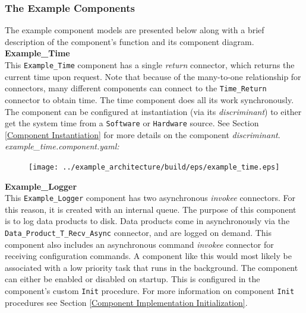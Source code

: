 \subsubsection{The Example Components} \label{The Example Components}

The example component models are presented below along with a brief description of the component's function and its component diagram. \\

\textbf{Example\_Time} \\

This \texttt{Example\_Time} component has a single \textit{return} connector, which returns the current time upon request. Note that because of the many-to-one relationship for connectors, many different components can connect to the \texttt{Time\_Return} connector to obtain time. The time component does all its work synchronously. The component can be configured at instantiation (via its \textit{discriminant}) to either get the system time from a \texttt{Software} or \texttt{Hardware} source. See Section \ref{Component Instantiation} for more details on the component \textit{discriminant}. \\

\textit{example\_time.component.yaml:}

\begin{figure}[H]
  \texttt{[image: ../example\_architecture/build/eps/example\_time.eps]}
\end{figure}

\textbf{Example\_Logger} \\

This \texttt{Example\_Logger} component has two asynchronous \textit{invokee} connectors. For this reason, it is created with an internal queue. The purpose of this component is to log data products to disk. Data products come in asynchronously via the \texttt{Data\_Product\_T\_Recv\_Async} connector, and are logged on demand. This component also includes an asynchronous command \textit{invokee} connector for receiving configuration commands. A component like this would most likely be associated with a low priority task that runs in the background. The component can either be enabled or disabled on startup. This is configured in the component's custom \texttt{Init} procedure. For more information on component \texttt{Init} procedures see Section \ref{Component Implementation Initialization}. \\

